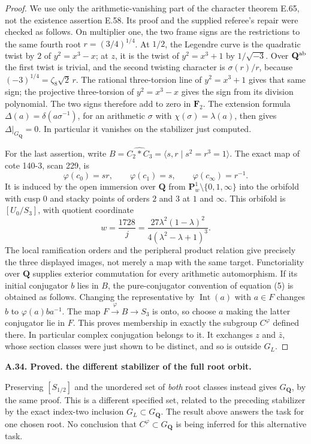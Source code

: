 \documentclass[11pt,oneside]{article}
\makeatletter
\newcounter{statementanchor}
\newenvironment{statement}[3]{%
 \refstepcounter{statementanchor}\def\@currentlabel{#1}%
 \par\addvspace{9pt}\noindent
 \textbf{#1. #2. #3.}\par\nobreak\noindent\ignorespaces
}{\par\addvspace{5pt}}
\makeatother
\begin{document}
\begin{proof}
We use only the arithmetic-vanishing part of the
character theorem E.65, not the existence assertion
E.58.  Its proof and the supplied referee's repair
were checked as follows.  On multiplier one, the two
frame signs are the restrictions to the same fourth
root $r=(3/4)^{1/4}$.  At $1/2$, the Legendre curve
is the quadratic twist by $2$ of $y^2=x^3-x$; at
$z$, it is the twist of $y^2=x^3+1$ by
$1/\sqrt{-3}$.  Over $\mathbf Q^{\rm ab}$ the first
twist is trivial, and the second twisting character
is $\sigma(r)/r$, because
$(-3)^{1/4}=\zeta_8\sqrt2\,r$.  The rational
three-torsion line of $y^2=x^3+1$ gives that same
sign; the projective three-torsion of $y^2=x^3-x$
gives the sign from its division polynomial.
The two signs therefore add to zero in $\mathbf F_2$.
The extension formula
$\Delta(a)=\delta(a\sigma^{-1})$, for an arithmetic
$\sigma$ with $\chi(\sigma)=\lambda(a)$, then gives
$\Delta|_{G_{\mathbf Q}}=0$.  In particular it
vanishes on the stabilizer just computed.

For the last assertion, write
$B=\widehat{C_2*C_3}=\langle s,r\mid s^2=r^3=1\rangle$.
The exact map of cote 140-3, scan 229, is
\[
 \varphi(c_0)=sr,\qquad \varphi(c_1)=s,
              \qquad\varphi(c_\infty)=r^{-1}.
\]
It is induced by the open immersion over $\mathbf Q$
from $\mathbf P^1_w\setminus\{0,1,\infty\}$ into
the orbifold with cusp $0$ and stacky points of orders
$2$ and $3$ at $1$ and $\infty$.  This orbifold is
$[U_0/S_3]$, with quotient coordinate
\[
        w=\frac{1728}{j}
          =\frac{27\lambda^2(1-\lambda)^2}
                  {4(\lambda^2-\lambda+1)^3}.
\]
The local ramification orders and the peripheral
product relation give precisely the three displayed
images, not merely a map with the same target.
Functoriality over $\mathbf Q$ supplies exterior
commutation for every arithmetic automorphism.
If its initial conjugator $b$ lies in $B$, the
pure-conjugator convention of equation (5) is obtained
as follows.  Changing the representative by
$\operatorname{Int}(a)$ with $a\in F$ changes $b$
to $\varphi(a)ba^{-1}$.  The map
$F\xrightarrow{\varphi}B\to S_3$ is onto, so
choose $a$ making the latter conjugator lie in $F$.
This proves membership in exactly the subgroup
$C^\varphi$ defined there.  In particular complex
conjugation belongs to it.  It exchanges $z$ and
$\bar z$, whose section classes were just shown to
be distinct, and so is outside $G_L$.
\end{proof}

\begin{statement}{A.34}{Proved}{the different stabilizer of the full root orbit}
\label{st:A.34}
\label{A:root-orbit-stabilizer}
Preserving $[S_{1/2}]$ and the unordered set of
\emph{both} root classes instead gives
$G_{\mathbf Q}$, by the same proof.  This is a
different specified set, related to the preceding
stabilizer by the exact index-two inclusion
$G_L\subset G_{\mathbf Q}$.  The result above answers
the task for one chosen root.  No conclusion that
$C^\varphi\subset G_{\mathbf Q}$ is being inferred
for this alternative task.
\end{statement}
\end{document}
